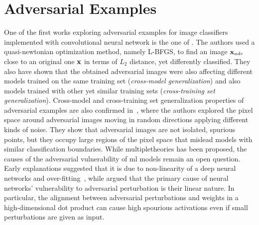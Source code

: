 \section{Adversarial Examples}
\label{sec:adv:rel-work}

One of the first works exploring adversarial examples for image classifiers implemented with convolutional neural network is the one of \citet{szegedy2013intriguing}.
The authors used a quasi-newtonian optimization method, namely L-BFGS, to find an image $\mathbf{x}_{adv}$ close to an original one $\mathbf{x}$ in terms of $L_2$ distance, yet differently classified.
They also have shown that the obtained adversarial images were also affecting different models trained on the same training set (\emph{cross-model generalization}) and also models trained with other yet similar training sets (\emph{cross-training set generalization}).
Cross-model and cross-training set generalization properties of adversarial examples are also confirmed in~\cite{tabacof2016exploring}, where the authors explored the pixel space around adversarial images moving in random directions applying different kinds of noise.
They show that adversarial images are not isolated, spurious points, but they occupy large regions of the pixel space that mislead models with similar classification boundaries.
While multipletheories has been proposed, the causes of the adversarial vulnerability of \gls{ml} models remain an open question.
Early explanations suggested that it is due to non-linearity of a deep neural networks and over-fitting~\cite{tabacof2016exploring}, while \citet{goodfellow2014explaining} argued that the primary cause of neural networks' vulnerability to adversarial perturbation is their linear nature.
In particular, the alignment between adversarial perturbations and weights in a high-dimensional dot product can cause high spourious activations even if small perturbations are given as input.


